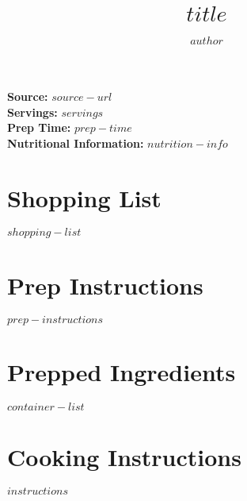 \documentclass{article}
\title{$title$}
\author{$author$}
\date{}
\begin{document}
\maketitle

\noindent
\textbf{Source:} $source-url$ \\
\textbf{Servings:} $servings$ \\
\textbf{Prep Time:} $prep-time$ \\
\textbf{Nutritional Information:} $nutrition-info$

\section*{Shopping List}
$shopping-list$

\section*{Prep Instructions}
$prep-instructions$

\newpage

\begin{multicols}{2}
\section*{Prepped Ingredients}
$container-list$

\columnbreak

\section*{Cooking Instructions}
$instructions$
\end{multicols}
\end{document}

